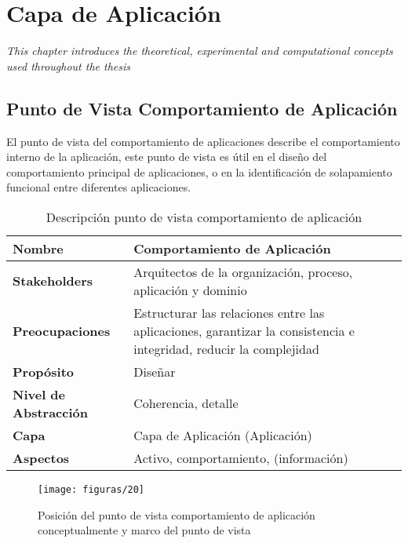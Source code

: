 \chapter{Capa de Aplicación}
\label{chap:Aplicacion}
\textit{This chapter introduces the theoretical, experimental and computational concepts used throughout the thesis}
\vspace{2ex}\vfill
\minitoc
\newpage

\section{Punto de Vista Comportamiento de Aplicación}
El punto de vista del comportamiento de aplicaciones describe el comportamiento interno de la aplicación, este punto de vista es útil en el diseño del comportamiento principal de aplicaciones, o en la identificación de solapamiento funcional entre diferentes aplicaciones.

  \begin{table}[H]
  	\centering
  	\begin{tabular}{p{3.7cm}p{8cm}}
  		\hline
  		\rowcolor[HTML]{0073a1}
  		{\color[HTML]{FFFFFF} \textbf{Nombre}} & {\color[HTML]{FFFFFF} \textbf{Comportamiento de Aplicación}} \\
  		\hline
  		\textbf{Stakeholders} & Arquitectos de la organización, proceso, aplicación y dominio \\
  		\textbf{Preocupaciones} & Estructurar las relaciones entre las aplicaciones, garantizar la consistencia e integridad, reducir la complejidad \\
  		\textbf{Propósito} & Diseñar \\
  		\textbf{Nivel de Abstracción} & Coherencia, detalle \\
  		\textbf{Capa} & Capa de Aplicación (Aplicación) \\
  		\textbf{Aspectos} & Activo, comportamiento, (información) \\
  		\bottomrule
  	\end{tabular}
	\captionsetup{width=.95\textwidth}
	\caption{Descripción punto de vista comportamiento de aplicación}
	\label{tabla10}
  \end{table}

  \begin{figure}[H]
	\centering
	\texttt{[image: figuras/20]}
	\captionsetup{width=.95\textwidth}
	\caption{Posición del punto de vista comportamiento de aplicación conceptualmente y marco del punto de vista}
	\label{figura20}
  \end{figure}

